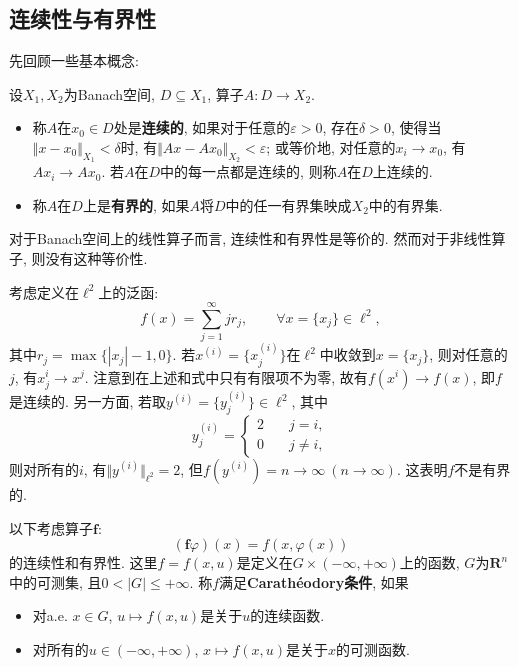 \subsection{连续性与有界性}

先回顾一些基本概念:

\begin{definition}
    设$X_1, X_2$为Banach空间, $D \subseteq X_1$, 算子$A\colon D \rightarrow X_2$.
    \begin{itemize}
        \item 称$A$在$x_0 \in D$处是\textbf{连续的}, 如果对于任意的$\varepsilon > 0$, 存在$\delta > 0$, 使得当$\Vert x - x_0\Vert_{X_1} < \delta$时, 有$\Vert Ax - Ax_0\Vert_{X_2} < \varepsilon$; 或等价地, 对任意的$x_i \rightarrow x_0$, 有$Ax_i \rightarrow Ax_0$. 若$A$在$D$中的每一点都是连续的, 则称$A$在$D$上连续的.
        \item 称$A$在$D$上是\textbf{有界的}, 如果$A$将$D$中的任一有界集映成$X_2$中的有界集.
    \end{itemize}
\end{definition}

对于Banach空间上的线性算子而言, 连续性和有界性是等价的. 然而对于非线性算子, 则没有这种等价性.

\begin{example}
    考虑定义在$\ell^2$上的泛函:
    \begin{equation*}
        f(x) = \sum_{j = 1}^{\infty}jr_j, \qquad \forall x = \{x_j\} \in \ell^2,
    \end{equation*}
    其中$r_j = \max\{|x_j| - 1, 0\}$. 若$x^{(i)} = \{x^{(i)}_j\}$在$\ell^2$中收敛到$x = \{x_j\}$, 则对任意的$j$, 有$x_j^{i} \rightarrow x^j$. 注意到在上述和式中只有有限项不为零, 故有$f(x^{i}) \rightarrow f(x)$, 即$f$是连续的. 另一方面, 若取$y^{(i)} = \{y^{(i)}_j\} \in \ell^2$, 其中 
    \begin{equation*}
        y^{(i)}_j = 
        \begin{cases}
            2 \quad &j = i, \\ 
            0 \quad &j \neq i,
        \end{cases}
    \end{equation*}
    则对所有的$i$, 有$\Vert y^{(i)}\Vert_{\ell^2} = 2$, 但$f(y^{(i)}) = n \rightarrow \infty\ (n \rightarrow \infty)$. 这表明$f$不是有界的.
\end{example}

以下考虑算子$\bm{f}\colon$
\begin{equation*}
    \boxed{(\bm{f}\varphi)(x) = f(x, \varphi(x))}
\end{equation*}
的连续性和有界性. 这里$f = f(x, u)$是定义在$G \times (-\infty, +\infty)$上的函数, $G$为$\mathbf{R}^n$中的可测集, 且$0 < |G| \leq +\infty$. 
称$f$满足\textbf{Carath\'eodory条件}, 如果 
\begin{itemize}
    \item 对a.e. $x \in G$, $u \mapsto f(x, u)$是关于$u$的连续函数.
    \item 对所有的$u \in (-\infty, +\infty)$, $x \mapsto f(x, u)$是关于$x$的可测函数.
\end{itemize}

